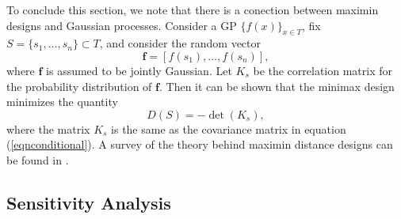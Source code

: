 \documentclass[12pt]{book}
\begin{document}
To conclude this section, we note that there is a conection between maximin designs and Gaussian processes. 
Consider a
GP $\{f(x)\}_{x\in T}$, fix $S=\{s_{1},\ldots,s_{n}\}\subset T$,  and consider the random vector
\begin{equation*}
\textbf{f}=[f(s_{1}),\ldots,f(s_{n})],
\end{equation*}
where $\textbf{f}$ is assumed to be jointly Gaussian. Let $K_{s}$ be 
the correlation matrix for the probability distribution of $\textbf{f}$. Then it can be shown
that the minimax design minimizes the quantity 
\begin{equation*}
D(S)=-\det(K_{s}),
\end{equation*}
where the matrix $K_{s}$ is the same as the covariance matrix in equation (\ref{eqnconditional}).
A survey of the theory behind maximin distance designs can be found in \cite{johnson1990minimax}.
\newline




\subsection{Sensitivity Analysis}\label{subsecSensitivity}
\end{document}

